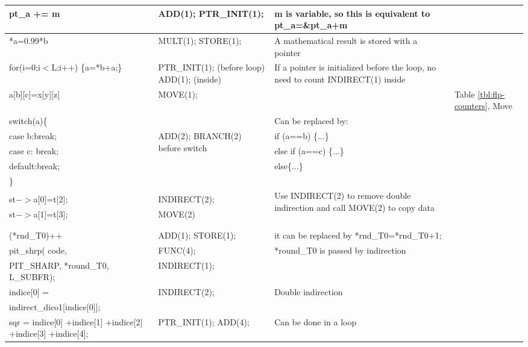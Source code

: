 \begin{center}
\begin{longtable}{|m{4.5cm}|m{4.5cm}|m{4cm}|m{2.0cm}|}
\hline
pt\_a += m	& ADD(1); PTR\_INIT(1);	& m is variable, so this is equivalent to  pt\_a=\&pt\_a+m	& \\
\hline
*a=0.99*b	& MULT(1); STORE(1); &	A mathematical result is stored with a pointer & \\
for(i=0;i$<$L;i++) \{a=*b+a;\} & PTR\_INIT(1); (before loop) ADD(1); (inside)	
& If a pointer is initialized before the loop, no need to count INDIRECT(1) inside
& \\
\hline	
a[b][c]=x[y][z]	& MOVE(1);	& &	Table \ref{tbl:flp-counters}, Move \\
\hline
switch(a)\{ & & Can be replaced by: &\\
case b:break; & \multirow{2}{4.5cm}{ADD(2); BRANCH(2) before switch} &
if (a==b) \{...\} &\\
case c: break; & & else if (a==c) \{...\} &\\
default:break; & & else\{...\} &\\
\} & & & \\
\hline
& & \multirow{4}{4cm}{Use INDIRECT(2) to remove 
double indirection and call MOVE(2) to copy data}	& \\
st$->$a[0]=t[2]; & INDIRECT(2); & \\
st$->$a[1]=t[3];	& MOVE(2) & & \\
& & &\\
& & &\\
\hline
(*rnd\_T0)++	& ADD(1); STORE(1);	&it can be replaced by 
*rnd\_T0=*rnd\_T0+1;	& \\	
\hline
pit\_shrp( code,  &	FUNC(4);&	  \multirow{2}{4cm}{*round\_T0 is passed by indirection}	&\\
PIT\_SHARP, *round\_T0, L\_SUBFR); &	INDIRECT(1);& 	&\\
\hline
indice[0] = & \multirow{2}{*}{INDIRECT(2);}	& \multirow{2}{*}{Double indirection} &\\
indirect\_dico1[indice[0]];	& & &\\
\hline
sqr = indice[0] +indice[1] +indice[2] +indice[3] +indice[4];&	PTR\_INIT(1);
ADD(4);	&Can be done in a loop	&\\
\hline
\end{longtable}
\end{center}

